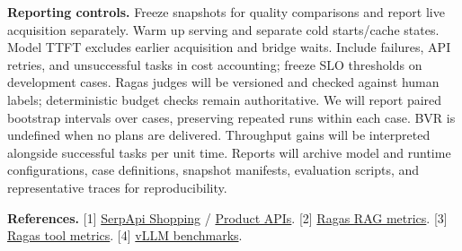 \documentclass[11pt,letterpaper]{article}
\begin{document}
\textbf{Reporting controls.} Freeze snapshots for quality comparisons and report live acquisition separately. Warm up serving and separate cold starts/cache states. Model TTFT excludes earlier acquisition and bridge waits. Include failures, API retries, and unsuccessful tasks in cost accounting; freeze SLO thresholds on development cases. Ragas judges will be versioned and checked against human labels; deterministic budget checks remain authoritative. We will report paired bootstrap intervals over cases, preserving repeated runs within each case. BVR is undefined when no plans are delivered. Throughput gains will be interpreted alongside successful tasks per unit time. Reports will archive model and runtime configurations, case definitions, snapshot manifests, evaluation scripts, and representative traces for reproducibility.

\vspace{2pt}
{\fontsize{9}{10.2}\selectfont
\textbf{References.}
[1] \href{https://serpapi.com/google-shopping-api}{SerpApi Shopping} / \href{https://serpapi.com/google-product-api}{Product APIs}.
[2] \href{https://docs.ragas.io/en/stable/concepts/metrics/available_metrics/}{Ragas RAG metrics}.
[3] \href{https://docs.ragas.io/en/stable/concepts/metrics/available_metrics/agents/}{Ragas tool metrics}.
[4] \href{https://docs.vllm.ai/en/latest/benchmarking/cli/}{vLLM benchmarks}.}
\end{document}
